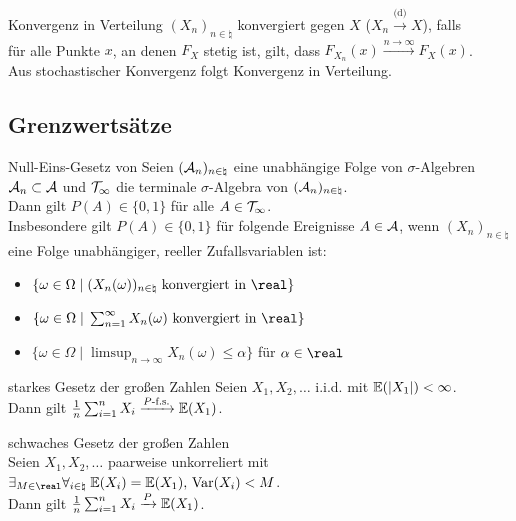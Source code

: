 \begin{Def}{Konvergenz in Verteilung}
    $(X_n)_{n \in \natural}$ konvergiert  gegen $X$
    ($X_n \xrightarrow{\text{(d)}} X$), falls\\
    für alle Punkte $x$, an denen $F_X$ stetig ist, gilt, dass
    $F_{X_n}(x) \xrightarrow{n \to \infty} F_X(x)$.\\
    Aus stochastischer Konvergenz folgt Konvergenz in Verteilung.
\end{Def}

\pagebreak

\subsection{%
    Grenzwertsätze%
}

\begin{Def}{Null-Eins-Gesetz von }
    Seien $(\mathcal{A}_n)_{n \in \natural}$ eine unabhängige Folge von $\sigma$-Algebren $\mathcal{A}_n \subset \mathcal{A}$
    und $\mathcal{T}_\infty$ die terminale $\sigma$-Algebra von $(\mathcal{A}_n)_{n \in \natural}$.\\
    Dann gilt $P(A) \in \{0, 1\}$ für alle $A \in \mathcal{T}_\infty$.\\
    Insbesondere gilt $P(A) \in \{0, 1\}$ für folgende Ereignisse $A \in \mathcal{A}$,
    wenn $(X_n)_{n \in \natural}$ eine Folge unabhängiger, reeller Zufallsvariablen ist:
    \begin{itemize}
        \item
        $\{\omega \in \Omega \;|\; (X_n(\omega))_{n \in \natural} \text{ konvergiert in } \real\}$

        \item
        $\{\omega \in \Omega \;|\; \sum_{n=1}^\infty X_n(\omega) \text{ konvergiert in } \real\}$

        \item
        $\{\omega \in \Omega \;|\; \limsup_{n \to \infty} X_n(\omega) \le \alpha\}$
        für $\alpha \in \real$
    \end{itemize}
\end{Def}

\begin{Def}{starkes Gesetz der großen Zahlen}
    Seien $X_1, X_2, \dotsc$ i.i.d. mit $\mathbb{E}(|X_1|) < \infty$.\\
    Dann gilt $\frac{1}{n} \sum_{i=1}^n X_i \xrightarrow{P\text{-f.s.}} \mathbb{E}(X_1)$.
\end{Def}

\begin{Def}{schwaches Gesetz der großen Zahlen}\\
    Seien $X_1, X_2, \dotsc$ paarweise unkorreliert mit
    $\exists_{M \in \real} \forall_{i \in \natural}\;
    \EE(X_i) = \EE(X_1),\, \Var(X_i) < M$.\\
    Dann gilt $\frac{1}{n} \sum_{i=1}^n X_i \xrightarrow{P} \mathbb{E}(X_1)$.
\end{Def}

